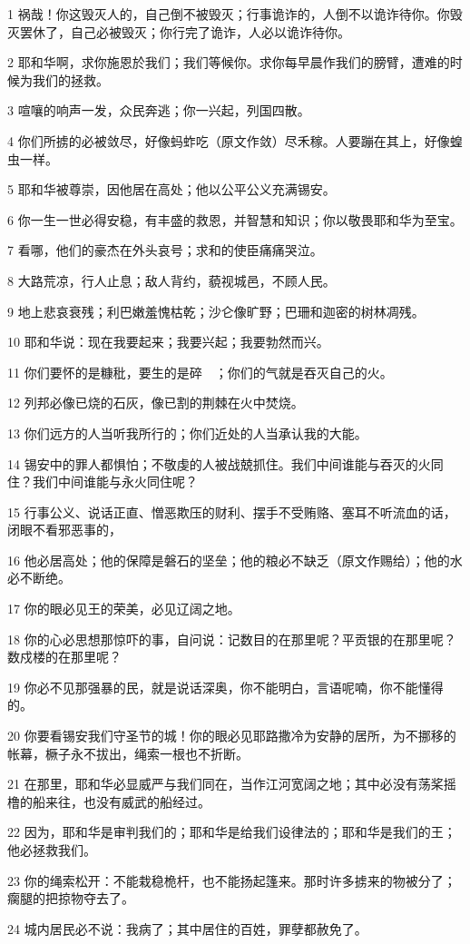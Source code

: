 \par 1 祸哉！你这毁灭人的，自己倒不被毁灭；行事诡诈的，人倒不以诡诈待你。你毁灭罢休了，自己必被毁灭；你行完了诡诈，人必以诡诈待你。
\par 2 耶和华啊，求你施恩於我们；我们等候你。求你每早晨作我们的膀臂，遭难的时候为我们的拯救。
\par 3 喧嚷的响声一发，众民奔逃；你一兴起，列国四散。
\par 4 你们所掳的必被敛尽，好像蚂蚱吃（原文作敛）尽禾稼。人要蹦在其上，好像蝗虫一样。
\par 5 耶和华被尊崇，因他居在高处；他以公平公义充满锡安。
\par 6 你一生一世必得安稳，有丰盛的救恩，并智慧和知识；你以敬畏耶和华为至宝。
\par 7 看哪，他们的豪杰在外头哀号；求和的使臣痛痛哭泣。
\par 8 大路荒凉，行人止息；敌人背约，藐视城邑，不顾人民。
\par 9 地上悲哀衰残；利巴嫩羞愧枯乾；沙仑像旷野；巴珊和迦密的树林凋残。
\par 10 耶和华说：现在我要起来；我要兴起；我要勃然而兴。
\par 11 你们要怀的是糠秕，要生的是碎　；你们的气就是吞灭自己的火。
\par 12 列邦必像已烧的石灰，像已割的荆棘在火中焚烧。
\par 13 你们远方的人当听我所行的；你们近处的人当承认我的大能。
\par 14 锡安中的罪人都惧怕；不敬虔的人被战兢抓住。我们中间谁能与吞灭的火同住？我们中间谁能与永火同住呢？
\par 15 行事公义、说话正直、憎恶欺压的财利、摆手不受贿赂、塞耳不听流血的话，闭眼不看邪恶事的，
\par 16 他必居高处；他的保障是磐石的坚垒；他的粮必不缺乏（原文作赐给）；他的水必不断绝。
\par 17 你的眼必见王的荣美，必见辽阔之地。
\par 18 你的心必思想那惊吓的事，自问说：记数目的在那里呢？平贡银的在那里呢？数戍楼的在那里呢？
\par 19 你必不见那强暴的民，就是说话深奥，你不能明白，言语呢喃，你不能懂得的。
\par 20 你要看锡安我们守圣节的城！你的眼必见耶路撒冷为安静的居所，为不挪移的帐幕，橛子永不拔出，绳索一根也不折断。
\par 21 在那里，耶和华必显威严与我们同在，当作江河宽阔之地；其中必没有荡桨摇橹的船来往，也没有威武的船经过。
\par 22 因为，耶和华是审判我们的；耶和华是给我们设律法的；耶和华是我们的王；他必拯救我们。
\par 23 你的绳索松开：不能栽稳桅杆，也不能扬起篷来。那时许多掳来的物被分了；瘸腿的把掠物夺去了。
\par 24 城内居民必不说：我病了；其中居住的百姓，罪孽都赦免了。

